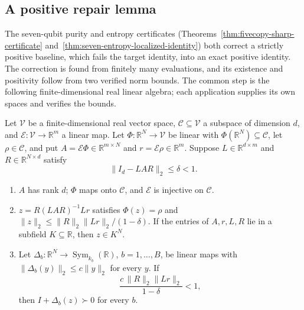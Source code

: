 \subsection{A positive repair lemma}
\label{sec:positive-repair}

The seven-qubit purity and entropy certificates
(Theorems~\ref{thm:fivecopy-sharp-certificate}
and~\ref{thm:seven-entropy-localized-identity}) both correct a strictly positive
baseline, which fails the target identity, into an exact positive identity. The
correction is found from finitely many evaluations, and its existence and
positivity follow from two verified norm bounds. The common step is the following
finite-dimensional real linear algebra; each application supplies its own spaces
and verifies the bounds.

\begin{lemma}
\label{lem:positive-repair}
Let $\mathcal V$ be a finite-dimensional real vector space, $\mathcal C\subseteq\mathcal V$
a subspace of dimension $d$, and $\mathcal E:\mathcal V\to\mathbb R^m$ a linear map. Let
$\Phi:\mathbb R^N\to\mathcal V$ be linear with $\Phi(\mathbb R^N)\subseteq\mathcal C$, let
$\rho\in\mathcal C$, and put $A=\mathcal E\Phi\in\mathbb R^{m\times N}$ and
$r=\mathcal E\rho\in\mathbb R^m$. Suppose $L\in\mathbb R^{d\times m}$ and
$R\in\mathbb R^{N\times d}$ satisfy
\begin{equation}\label{eq:positive-repair-inverse}
 \|I_d-LAR\|_2\le\delta<1 .
\end{equation}
\begin{enumerate}
\item[(a)] $A$ has rank $d$; $\Phi$ maps onto $\mathcal C$, and $\mathcal E$ is injective
  on $\mathcal C$.
\item[(b)] $z=R(LAR)^{-1}Lr$ satisfies $\Phi(z)=\rho$ and
  $\|z\|_2\le\|R\|_2\|Lr\|_2/(1-\delta)$. If the entries of $A,r,L,R$ lie in a
  subfield $K\subseteq\mathbb R$, then $z\in K^N$.
\item[(c)] Let $\Delta_b:\mathbb R^N\to\operatorname{Sym}_{k_b}(\mathbb R)$, $b=1,\ldots,B$, be
  linear maps with $\|\Delta_b(y)\|_2\le c\|y\|_2$ for every $y$. If
  \begin{equation}\label{eq:positive-repair-margin}
   \frac{c\,\|R\|_2\|Lr\|_2}{1-\delta}<1,
  \end{equation}
  then $I+\Delta_b(z)\succ0$ for every $b$.
\end{enumerate}
\end{lemma}
